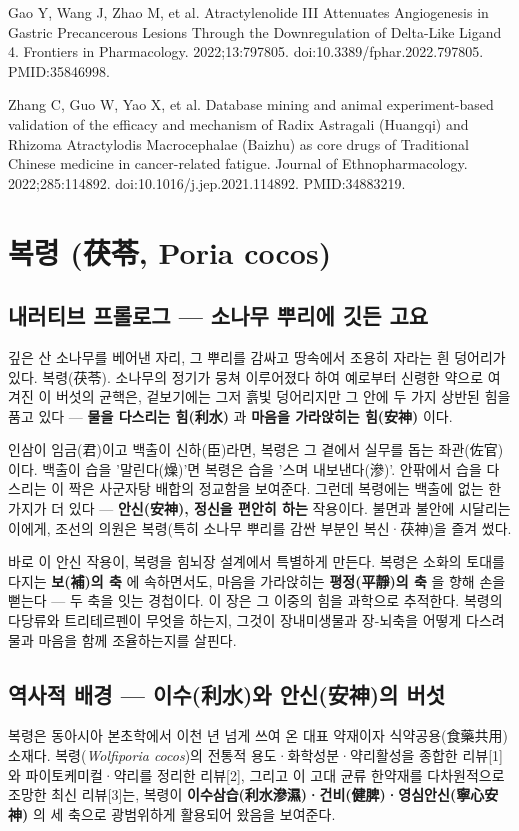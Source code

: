 \documentclass[11pt,oneside]{book}
\newcommand{\refend}{\endgroup\par}
\newcommand{\reff}[2]{\par\hangindent=7mm\hangafter=1\noindent[#1]\hspace{2mm}#2\par}
\begin{document}
\reff{50}{Gao Y, Wang J, Zhao M, et al. Atractylenolide III Attenuates Angiogenesis in Gastric Precancerous Lesions Through the Downregulation of Delta-Like Ligand 4. Frontiers in Pharmacology. 2022;13:797805. doi:10.3389/fphar.2022.797805. PMID:35846998.}
\reff{51}{Zhang C, Guo W, Yao X, et al. Database mining and animal experiment-based validation of the efficacy and mechanism of Radix Astragali (Huangqi) and Rhizoma Atractylodis Macrocephalae (Baizhu) as core drugs of Traditional Chinese medicine in cancer-related fatigue. Journal of Ethnopharmacology. 2022;285:114892. doi:10.1016/j.jep.2021.114892. PMID:34883219.}
\refend


\chapter{복령 (茯苓, Poria cocos)}

\section{내러티브 프롤로그 — 소나무 뿌리에 깃든 고요}
깊은 산 소나무를 베어낸 자리, 그 뿌리를 감싸고 땅속에서 조용히 자라는 흰 덩어리가 있다. 복령(茯苓). 소나무의 정기가 뭉쳐 이루어졌다 하여 예로부터 신령한 약으로 여겨진 이 버섯의 균핵은, 겉보기에는 그저 흙빛 덩어리지만 그 안에 두 가지 상반된 힘을 품고 있다 — \textbf{물을 다스리는 힘(利水)} 과 \textbf{마음을 가라앉히는 힘(安神)} 이다.

인삼이 임금(君)이고 백출이 신하(臣)라면, 복령은 그 곁에서 실무를 돕는 좌관(佐官)이다. 백출이 습을 '말린다(燥)'면 복령은 습을 '스며 내보낸다(滲)'. 안팎에서 습을 다스리는 이 짝은 사군자탕 배합의 정교함을 보여준다. 그런데 복령에는 백출에 없는 한 가지가 더 있다 — \textbf{안신(安神), 정신을 편안히 하는} 작용이다. 불면과 불안에 시달리는 이에게, 조선의 의원은 복령(특히 소나무 뿌리를 감싼 부분인 복신·茯神)을 즐겨 썼다.

바로 이 안신 작용이, 복령을 힘뇌장 설계에서 특별하게 만든다. 복령은 소화의 토대를 다지는 \textbf{보(補)의 축} 에 속하면서도, 마음을 가라앉히는 \textbf{평정(平靜)의 축} 을 향해 손을 뻗는다 — 두 축을 잇는 경첩이다. 이 장은 그 이중의 힘을 과학으로 추적한다. 복령의 다당류와 트리테르펜이 무엇을 하는지, 그것이 장내미생물과 장-뇌축을 어떻게 다스려 물과 마음을 함께 조율하는지를 살핀다.

\section{역사적 배경 — 이수(利水)와 안신(安神)의 버섯}
복령은 동아시아 본초학에서 이천 년 넘게 쓰여 온 대표 약재이자 식약공용(食藥共用) 소재다. 복령(\textit{Wolfiporia cocos})의 전통적 용도·화학성분·약리활성을 종합한 리뷰[1]와 파이토케미컬·약리를 정리한 리뷰[2], 그리고 이 고대 균류 한약재를 다차원적으로 조망한 최신 리뷰[3]는, 복령이 \textbf{이수삼습(利水滲濕)·건비(健脾)·영심안신(寧心安神)} 의 세 축으로 광범위하게 활용되어 왔음을 보여준다.
\end{document}
